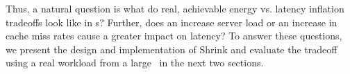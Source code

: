 Thus, a natural question is what do real, achievable energy vs. latency inflation tradeoffs look like in \cdc s? 
Further, does an increase server load or an increase in cache miss rates cause a greater impact on latency? 
To answer these questions, we present the design and implementation of Shrink and evaluate the tradeoff using a real workload from a large \cdc\  in the next two sections.